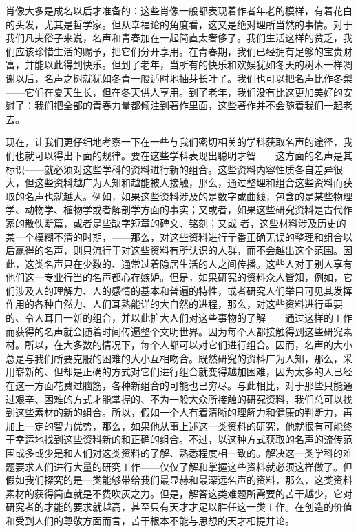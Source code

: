 \documentclass[12pt,oneside]{book}
\begin{document}
肖像大多是成名以后才准备的：这些肖像一般都表现着作者年老的模样，有着花白的头发，尤其是哲学家。但从幸福论的角度看，这又是绝对理所当然的事情。对于我们凡夫俗子来说，名声和青春加在一起简直太奢侈了。我们生活这样的贫乏，我们应该珍惜生活的赐予，把它们分开享用。在青春期，我们已经拥有足够的宝贵财富，并能以此得到快乐。但到了老年，当所有的快乐和欢娱犹如冬天的树木一样凋谢以后，名声之树就犹如冬青一般适时地抽芽长叶了。我们也可以把名声比作冬梨——它们在夏天生长，但在冬天供人享用。到了老年，我们没有比这更加美好的安慰了：我们把全部的青春力量都倾注到著作里面，这些著作并不会随着我们一起老去。 

现在，让我们更仔细地考察一下在一些与我们密切相关的学科获取名声的途径，我们也就可以得出下面的规律。要在这些学科表现出聪明才智——这方面的名声是其标识——就必须对这些学科的资料进行新的组合。这些资料内容性质各自差异很大，但这些资料越广为人知和越能被人接触，那么，通过整理和组合这些资料而获取的名声也就越大。例如，如果这些资料涉及的是数字或曲线，包含的是某些物理学、动物学、植物学或者解剖学方面的事实；又或者，如果这些研究资料是古代作家的散佚断篇，或者是些缺字短章的碑文、铭刻；又或
者，这些材料涉及历史的某一个模糊不清的时期，——那么，对这些资料进行亍番正确无误的整理和组合以后赢得的名声，则只流行于对这些资料有所认识的人群，而不会越出这个范围。因此，这类名声只在少数的、通常过着隐居生活的人之间传播。这些人对于别人享有他们这一专业行当的名声都心存嫉妒。但是，如果研究的资料众人皆知，例如，它们涉及人的理解力、人的感情的基本和普遍的特性，或者研究人们举目可见其发挥作用的各种自然力、人们耳熟能详的大自然的进程，那么，对这些资料进行重要的、令人耳目一新的组合，并以此扩大人们对这些事物的了解——通过这样的工作而获得的名声就会随着时间传遍整个文明世界。因为每个人都接触得到这些研究素材。所以，在大多数的情况下，每个人都可以对它们进行组合。因而，名声的大小总是与我们所要克服的困难的大小互相吻合。既然研究的资料广为人知，那么，采用崭新的、但却是正确的方式对它们进行组合就变得越加困难，因为太多的人已经在这一方面花费过脑筋，各种新组合的可能也已穷尽。与此相比，对于那些只能通过艰辛、困难的方式才能掌握的、不为一般大众所接触的研究资料，我们总可以找到这些素材的新的组合。所以，假如一个人有着清晰的理解力和健康的判断力，再加上一定的智力优势，那么，如果他从事上述这一类资料的研究，他就很有可能终于幸运地找到这些资料新的和正确的组合。不过，以这种方式获取的名声的流传范围或多或少是和人们对这类资料的了解、熟悉程度相一致的。解决这一类学科的难题要求人们进行大量的研究工作——仅仅了解和掌握这些资料就必须这样做了。但假如我们探究的是一类能够带给我们最显赫和最深远名声的资料，那么，这类资料素材的获得简直就是不费吹灰之力。但是，解答这类难题所需要的苦干越少，它对研究者的才能的要求就越高，甚至只有天才才足以胜任这一类工作。在创造的价值和受到人们的尊敬方面而言，苦干根本不能与思想的天才相提并论。 
\end{document}
